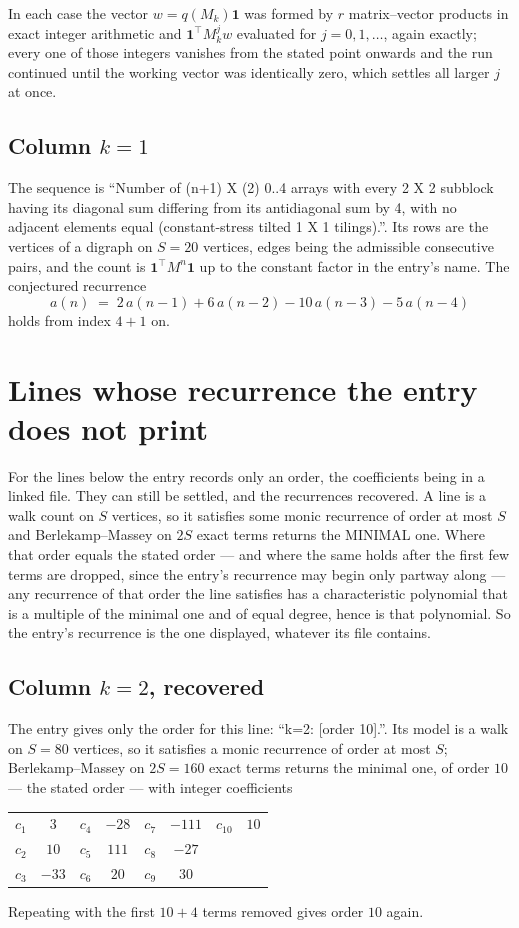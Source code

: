 \documentclass[11pt,a4paper]{article}
\theoremstyle{plain}
\theoremstyle{definition}
\begin{document}
In each case the vector $w=q(M_k)\mathbf{1}$ was formed by $r$ matrix--vector products in
exact integer arithmetic and $\mathbf{1}^{\!\top}M_k^{j}w$ evaluated for $j=0,1,\dots$,
again exactly; every one of those integers vanishes from the stated point onwards and the run
continued until the working vector was identically zero, which settles all larger $j$ at once.

\subsection*{Column $k$$=1$}
The sequence is ``Number of (n+1) X (2) 0..4 arrays with every 2 X 2 subblock having its diagonal sum differing from its antidiagonal sum by 4, with no adjacent elements equal (constant-stress tilted 1 X 1 tilings).''. Its rows are the vertices of a digraph on
$S=20$ vertices, edges being the admissible consecutive pairs, and the count is
$\mathbf{1}^{\!\top}M^{n}\mathbf{1}$ up to the constant factor in the entry's name.
The conjectured recurrence
\[
a(n)\;=\;2\,a(n-1) + 6\,a(n-2) - 10\,a(n-3) - 5\,a(n-4)
\]
holds from index $4+1$ on.


\section{Lines whose recurrence the entry does not print}

For the lines below the entry records only an order, the coefficients being in a linked file.
They can still be settled, and the recurrences recovered. A line is a walk count on $S$
vertices, so it satisfies some monic recurrence of order at most $S$ and Berlekamp--Massey on
$2S$ exact terms returns the MINIMAL one. Where that order equals the stated order --- and
where the same holds after the first few terms are dropped, since the entry's recurrence may
begin only partway along --- any recurrence of that order the line satisfies has a
characteristic polynomial that is a multiple of the minimal one and of equal degree, hence is
that polynomial. So the entry's recurrence is the one displayed, whatever its file contains.

\subsection*{Column $k=2$, recovered}
The entry gives only the order for this line: ``k=2: [order 10].''. Its model is a walk on
$S=80$ vertices, so it satisfies a monic recurrence of order at most $S$;
Berlekamp--Massey on $2S=160$ exact terms returns the minimal one, of order
$10$ --- the stated order --- with integer coefficients
\begin{center}\small\begin{tabular}{cccccccc}
$c_{1}$ & $3$ & $c_{4}$ & $-28$ & $c_{7}$ & $-111$ & $c_{10}$ & $10$ \\
$c_{2}$ & $10$ & $c_{5}$ & $111$ & $c_{8}$ & $-27$ &  &  \\
$c_{3}$ & $-33$ & $c_{6}$ & $20$ & $c_{9}$ & $30$ &  &  \\
\end{tabular}\end{center}
Repeating with the first $10+4$ terms removed gives order $10$ again.
\end{document}
